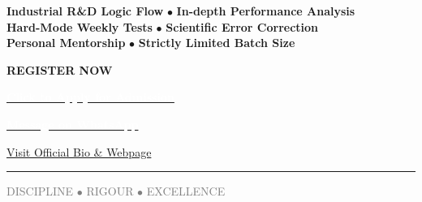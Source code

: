 \documentclass[11pt,a4paper]{article}
\begin{document}
\vspace{20pt}

\begin{tcolorbox}[colback=softblue, colframe=brandblue, arc=15pt, title=\textbf{\faGem \quad THE MENTORSHIP EDGE}]
    \centering
    \textbf{Industrial R\&D Logic Flow} $\bullet$ \textbf{In-depth Performance Analysis}\\
    \textbf{Hard-Mode Weekly Tests} $\bullet$ \textbf{Scientific Error Correction}\\
    \textbf{Personal Mentorship} $\bullet$ \textbf{Strictly Limited Batch Size}
\end{tcolorbox}

\vfill

\begin{center}
    \Huge \textbf{REGISTER NOW}\\[0.5em]
    
    \begin{tcolorbox}[colback=brandblue, colframe=brandblue, width=0.7\textwidth, arc=15pt, center]
        \centering \href{https://amolthakrein-glitch.github.io/research_teaching_webpage/registration.html}{\textcolor{white}{\Large\textbf{\faEdit \quad Click to Apply for Admission}}}
    \end{tcolorbox}
    
    \begin{tcolorbox}[colback=green!60!black, colframe=green!60!black, width=0.7\textwidth, arc=15pt, center]
        \centering \href{https://wa.me/919591233320?text=I%20saw%20your%20flyer%20and%20want%20to%20enquire%20about%20JEE%2FNEET%20coaching.}{\textcolor{white}{\Large\textbf{\faWhatsapp \quad Message on WhatsApp}}}
    \end{tcolorbox}
    
    \vspace{1em}
    \href{https://amolthakrein-glitch.github.io/research_teaching_webpage/index.html}{\textcolor{brandblue}{\faGlobe \quad Visit Official Bio \& Webpage}}
\end{center}

\vspace{10pt}
\hrule
\begin{center}
    \textcolor{gray}{\small DISCIPLINE \quad $\bullet$ \quad RIGOUR \quad $\bullet$ \quad EXCELLENCE}
\end{center}
\end{document}
